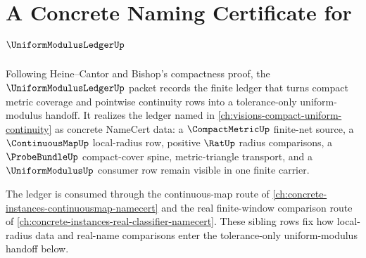 \chapter{A Concrete Naming Certificate for $\UniformModulusLedgerUp$}
\label{ch:concrete-instances-uniform-modulus-ledger-namecert}

Following Heine--Cantor and Bishop's compactness proof, the $\UniformModulusLedgerUp$ packet records the finite ledger that turns compact metric coverage and pointwise continuity rows into a tolerance-only uniform-modulus handoff. It realizes the ledger named in \autoref{ch:visions-compact-uniform-continuity} as concrete NameCert data: a $\CompactMetricUp$ finite-net source, a $\ContinuousMapUp$ local-radius row, positive $\RatUp$ radius comparisons, a $\ProbeBundleUp$ compact-cover spine, metric-triangle transport, and a $\UniformModulusUp$ consumer row remain visible in one finite carrier.

The ledger is consumed through the continuous-map route of \autoref{ch:concrete-instances-continuousmap-namecert} and the real finite-window comparison route of \autoref{ch:concrete-instances-real-classifier-namecert}. These sibling rows fix how local-radius data and real-name comparisons enter the tolerance-only uniform-modulus handoff below.

